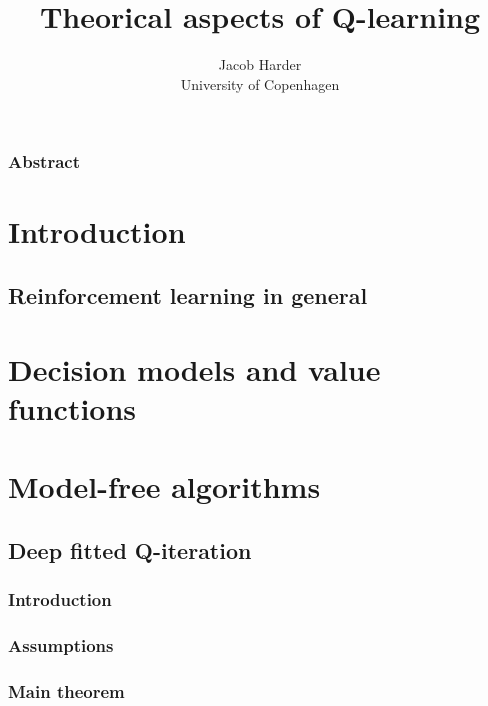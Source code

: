 \documentclass{report}
\title{Theorical aspects of Q-learning}
\author{Jacob Harder \\ University of Copenhagen}
\begin{document}


\subsection*{Abstract}


\newpage
\renewcommand{\baselinestretch}{1.0}\normalsize
\tableofcontents
\renewcommand{\baselinestretch}{1.3}\normalsize

\newpage
\chapter{Introduction}

\section{Reinforcement learning in general}

%
\chapter{Decision models and value functions}


\chapter{Model-free algorithms}


\section{Deep fitted Q-iteration}
\subsection{Introduction}

\subsection{Assumptions}

\subsection{Main theorem}

\end{document}
